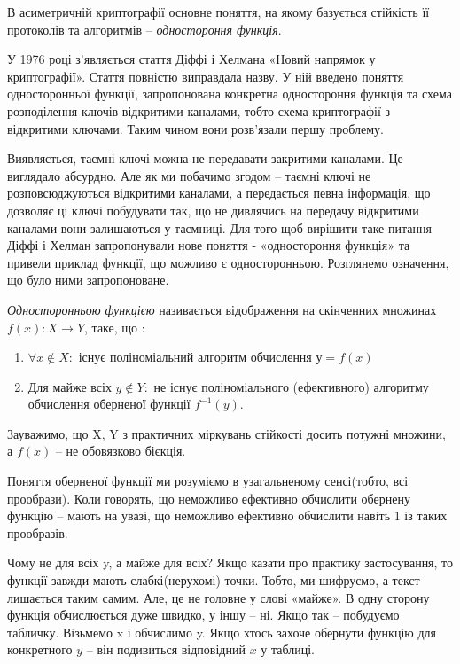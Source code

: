 В асиметричній криптографії основне поняття, на якому базується стійкість її протоколів та алгоритмів – \textit{одностороння функція}. 

У 1976 році з’являється стаття Діффі і Хелмана «Новий напрямок у криптографії». Стаття повністю виправдала назву. У ній введено поняття односторонньої функції, запропонована конкретна одностороння функція та схема розподілення ключів відкритими каналами, тобто схема криптографії з відкритими ключами. Таким чином вони розв’язали першу проблему.

Виявляється, таємні ключі можна не передавати закритими каналами. Це виглядало абсурдно. Але як ми побачимо згодом – таємні ключі не розповсюджуються відкритими каналами, а передається певна інформація, що дозволяє ці ключі побудувати так, що не дивлячись на передачу відкритими каналами вони залишаються у таємниці. Для того щоб вирішити таке питання Діффі і Хелман запропонували нове поняття - «одностороння функція» та привели приклад функції, що можливо є односторонньою. Розглянемо означення, що було ними запропоноване.

\begin{mydef}
\textit{Односторонньою функцією} називається відображення на скінченних множинах \( f(x) : X\rightarrow Y \), таке, що :
\begin{enumerate}
\item $\forall x \notin X \colon$ існує поліноміальний алгоритм обчислення $у = f(x)$

\item Для майже всіх $y\notin Y \colon$ не існує поліноміального (ефективного) алгоритму обчислення оберненої функції $f^{-1}(y)$.
\end{enumerate}
Зауважимо, що X, Y з практичних міркувань стійкості досить потужні множини, а $f(x)$ – не обовязково бієкція.
\end{mydef}

Поняття оберненої функції ми розуміємо в узагальненому сенсі(тобто, всі прообрази). Коли говорять, що неможливо ефективно обчислити обернену функцію – мають на увазі, що неможливо ефективно обчислити навіть 1 із таких прообразів.

Чому не для всіх y, а майже для всіх? Якщо казати про практику застосування, то функції завжди мають слабкі(нерухомі) точки. Тобто, ми шифруємо, а текст лишається таким самим. Але, це не головне у слові «майже». В одну сторону функція обчислюється дуже швидко, у іншу – ні. Якщо так – побудуємо  табличку. Візьмемо x і обчислимо y. Якщо хтось захоче обернути функцію для конкретного $y$ – він подивиться відповідний $x$ у таблиці. 

